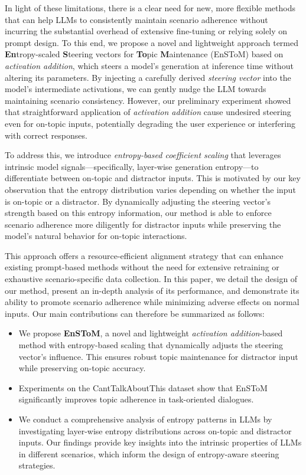 \documentclass[11pt]{article}
\begin{document}
In light of these limitations, there is a clear need for new, more flexible methods that can help LLMs to consistently maintain scenario adherence without incurring the substantial overhead of extensive fine-tuning or relying solely on prompt design.
To this end, we propose a novel and lightweight approach termed \textbf{En}tropy-scaled \textbf{S}teering vectors for \textbf{To}pic \textbf{M}aintenance (EnSToM) based on \textit{activation addition}, which steers a model’s generation at inference time without altering its parameters. By injecting a carefully derived \textit{steering vector} into the model’s intermediate activations, we can gently nudge the LLM towards maintaining scenario consistency. However, our preliminary experiment showed that straightforward application of \textit{activation addition} cause undesired steering even for on-topic inputs, potentially degrading the user experience or interfering with correct responses.

To address this, we introduce \textit{entropy-based coefficient scaling} that leverages intrinsic model signals—specifically, layer-wise generation entropy—to differentiate between on-topic and distractor inputs. This is motivated by our key observation that the entropy distribution varies depending on whether the input is on-topic or a distractor. By dynamically adjusting the steering vector’s strength based on this entropy information, our method is able to enforce scenario adherence more diligently for distractor inputs while preserving the model’s natural behavior for on-topic interactions.

This approach offers a resource-efficient alignment strategy that can enhance existing prompt-based methods without the need for extensive retraining or exhaustive scenario-specific data collection. In this paper, we detail the design of our method, present an in-depth analysis of its performance, and demonstrate its ability to promote scenario adherence while minimizing adverse effects on normal inputs. Our main contributions can therefore be summarized as follows:

\begin{itemize}
    \item We propose \textbf{EnSToM}, a novel and lightweight \textit{activation addition}-based method with entropy-based scaling that dynamically adjusts the steering vector’s influence. This ensures robust topic maintenance for distractor input while preserving on-topic accuracy.
    \item Experiments on the CantTalkAboutThis dataset show that EnSToM significantly improves topic adherence in task-oriented dialogues.
    \item We conduct a comprehensive analysis of entropy patterns in LLMs by investigating layer-wise entropy distributions across on-topic and distractor inputs. Our findings provide key insights into the intrinsic properties of LLMs in different scenarios, which inform the design of entropy-aware steering strategies.
\end{itemize}
\end{document}

